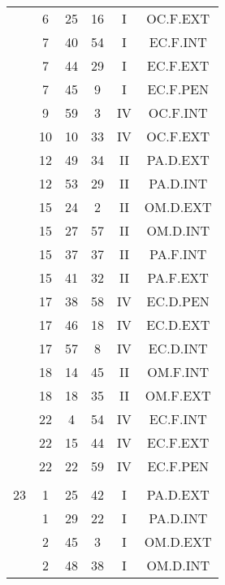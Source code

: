 \documentclass[12pt, a4paper]{article}
\begin{document}
\begin{multicols}{3}
{\begin{tabular}{c c c c c c}
	 	 	 	 & 6 & 25 & 16 & I & OC.F.EXT\\%
	 	 	 	 & 7 & 40 & 54 & I & EC.F.INT\\%
	 	 	 	 & 7 & 44 & 29 & I & EC.F.EXT\\%
	 	 	 	 & 7 & 45 & 9 & I & EC.F.PEN\\%
	 	 	 	 & 9 & 59 & 3 & IV & OC.F.INT\\%
	 	 	 	 & 10 & 10 & 33 & IV & OC.F.EXT\\%
	 	 	 	 & 12 & 49 & 34 & II & PA.D.EXT\\%
	 	 	 	 & 12 & 53 & 29 & II & PA.D.INT\\%
	 	 	 	 & 15 & 24 & 2 & II & OM.D.EXT\\%
	 	 	 	 & 15 & 27 & 57 & II & OM.D.INT\\%
	 	 	 	 & 15 & 37 & 37 & II & PA.F.INT\\%
	 	 	 	 & 15 & 41 & 32 & II & PA.F.EXT\\%
	 	 	 	 & 17 & 38 & 58 & IV & EC.D.PEN\\%
	 	 	 	 & 17 & 46 & 18 & IV & EC.D.EXT\\%
	 	 	 	 & 17 & 57 & 8 & IV & EC.D.INT\\%
	 	 	 	 & 18 & 14 & 45 & II & OM.F.INT\\%
	 	 	 	 & 18 & 18 & 35 & II & OM.F.EXT\\%
	 	 	 	 & 22 & 4 & 54 & IV & EC.F.INT\\%
	 	 	 	 & 22 & 15 & 44 & IV & EC.F.EXT\\%
	 	 	 	 & 22 & 22 & 59 & IV & EC.F.PEN\\%
	 	 	 	 & & & & & \\%
	 	 	 	23 & 1 & 25 & 42 & I & PA.D.EXT\\%
	 	 	 	 & 1 & 29 & 22 & I & PA.D.INT\\%
	 	 	 	 & 2 & 45 & 3 & I & OM.D.EXT\\%
	 	 	 	 & 2 & 48 & 38 & I & OM.D.INT\\%
	 	 \end{tabular}
 	}
\end{multicols}
\end{document}
